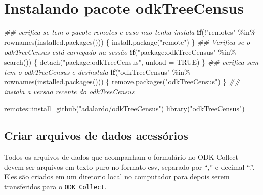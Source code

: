 \documentclass[
  letterpaper,
]{report}
\newenvironment{Shaded}{\begin{snugshade}}{\end{snugshade}}
\newcommand{\AttributeTok}[1]{\textcolor[rgb]{0.40,0.45,0.13}{#1}}
\newcommand{\ConstantTok}[1]{\textcolor[rgb]{0.56,0.35,0.01}{#1}}
\newcommand{\ControlFlowTok}[1]{\textcolor[rgb]{0.00,0.23,0.31}{\textbf{#1}}}
\newcommand{\DocumentationTok}[1]{\textcolor[rgb]{0.37,0.37,0.37}{\textit{#1}}}
\newcommand{\FunctionTok}[1]{\textcolor[rgb]{0.28,0.35,0.67}{#1}}
\newcommand{\NormalTok}[1]{\textcolor[rgb]{0.00,0.23,0.31}{#1}}
\newcommand{\SpecialCharTok}[1]{\textcolor[rgb]{0.37,0.37,0.37}{#1}}
\newcommand{\StringTok}[1]{\textcolor[rgb]{0.13,0.47,0.30}{#1}}
\begin{document}
\chapter{Instalando pacote
odkTreeCensus}\label{instalando-pacote-odktreecensus}

 

\begin{Shaded}
\begin{Highlighting}[]
\DocumentationTok{\#\# verifica se tem o pacote remotes e caso nao tenha instala}
\ControlFlowTok{if}\NormalTok{(}\SpecialCharTok{!}\StringTok{"remotes"} \SpecialCharTok{\%in\%} \FunctionTok{rownames}\NormalTok{(}\FunctionTok{installed.packages}\NormalTok{()))}
\NormalTok{\{}
    \FunctionTok{install.package}\NormalTok{(}\StringTok{"remote"}\NormalTok{)}
\NormalTok{\}}
\DocumentationTok{\#\# Verifica se o odkTreeCensus está carregado na sessão}
\ControlFlowTok{if}\NormalTok{(}\StringTok{"package:odkTreeCensus"} \SpecialCharTok{\%in\%} \FunctionTok{search}\NormalTok{())}
\NormalTok{\{}
    \FunctionTok{detach}\NormalTok{(}\StringTok{"package:odkTreeCensus"}\NormalTok{, }\AttributeTok{unload =} \ConstantTok{TRUE}\NormalTok{)}
\NormalTok{\}}
\DocumentationTok{\#\# verifica sem tem o odkTreeCensus e desinstala}
\ControlFlowTok{if}\NormalTok{(}\StringTok{"odkTreeCensus"} \SpecialCharTok{\%in\%} \FunctionTok{rownames}\NormalTok{(}\FunctionTok{installed.packages}\NormalTok{()))}
\NormalTok{\{}
    \FunctionTok{remove.packages}\NormalTok{(}\StringTok{"odkTreeCensus"}\NormalTok{)}
\NormalTok{\}}
\DocumentationTok{\#\# instala a versao recente do odkTreeCensus}

\NormalTok{remotes}\SpecialCharTok{::}\FunctionTok{install\_github}\NormalTok{(}\StringTok{"adalardo/odkTreeCensus"}\NormalTok{)}
\FunctionTok{library}\NormalTok{(}\StringTok{"odkTreeCensus"}\NormalTok{)}
\end{Highlighting}
\end{Shaded}

\section{Criar arquivos de dados
acessórios}\label{criar-arquivos-de-dados-acessuxf3rios}

Todos os arquivos de dados que acompanham o formulário no ODK Collect
devem ser arquivos em texto puro no formato csv, separado por ``,'' e
decimal ``.''. Eles são criados em um diretorio local no computador para
depois serem transferidos para o \texttt{ODK\ Collect}.
\end{document}
